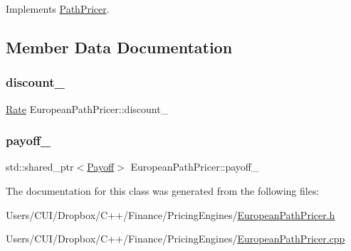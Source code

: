 Implements \hyperlink{class_path_pricer_a057bf6a83f0cc2be06154144192ed918}{Path\+Pricer}.



\subsection{Member Data Documentation}
\hypertarget{class_european_path_pricer_a1bb1874fe4f263bff17a998f0ec9588c}{}\label{class_european_path_pricer_a1bb1874fe4f263bff17a998f0ec9588c} 
\subsubsection{\texorpdfstring{discount\+\_\+}{discount\_}}
{\footnotesize\ttfamily \hyperlink{_name_def_8h_a25bee43a162de339c81f3d1caf6b887d}{Rate} European\+Path\+Pricer\+::discount\+\_\+\hspace{0.3cm}{\ttfamily [private]}}

\hypertarget{class_european_path_pricer_a2023ec56bae32c6db123e8d400d2b0cf}{}\label{class_european_path_pricer_a2023ec56bae32c6db123e8d400d2b0cf} 
\subsubsection{\texorpdfstring{payoff\+\_\+}{payoff\_}}
{\footnotesize\ttfamily std\+::shared\+\_\+ptr$<$\hyperlink{class_payoff}{Payoff}$>$ European\+Path\+Pricer\+::payoff\+\_\+\hspace{0.3cm}{\ttfamily [private]}}



The documentation for this class was generated from the following files\+:\begin{DoxyCompactItemize}
\item 
Users/\+C\+U\+I/\+Dropbox/\+C++/\+Finance/\+Pricing\+Engines/\hyperlink{_european_path_pricer_8h}{European\+Path\+Pricer.\+h}\item 
Users/\+C\+U\+I/\+Dropbox/\+C++/\+Finance/\+Pricing\+Engines/\hyperlink{_european_path_pricer_8cpp}{European\+Path\+Pricer.\+cpp}\end{DoxyCompactItemize}
